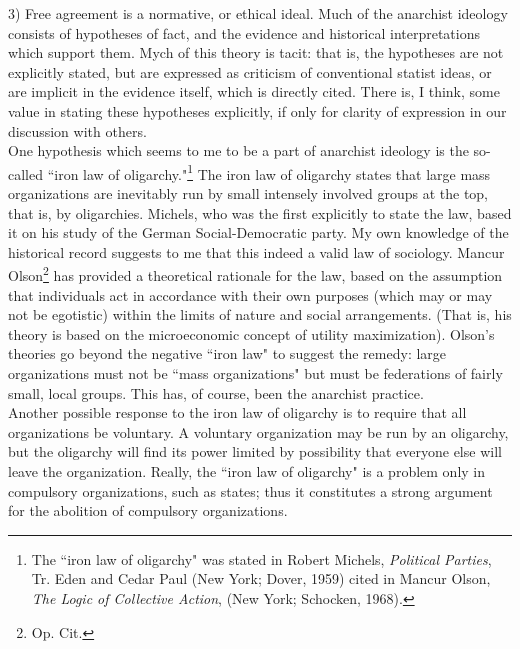 \documentclass[12pt, onecolumn, letterpaper, oneside]{book}
\begin{document}
3) Free agreement is a normative, or ethical ideal. Much of the anarchist ideology consists of hypotheses of fact, and the evidence and historical interpretations which support them. Mych of this theory is tacit: that is, the hypotheses are not explicitly stated, but are expressed as criticism of conventional statist ideas, or are implicit in the evidence itself, which is directly cited. There is, I think, some value in stating these hypotheses explicitly, if only for clarity of expression in our discussion with others.\\
One hypothesis which seems to me to be a part of anarchist ideology is the so-called ``iron law of oligarchy."\footnote{The ``iron law of oligarchy" was stated in Robert Michels, \emph{Political Parties}, Tr. Eden and Cedar Paul (New York; Dover, 1959) cited in Mancur Olson, \emph{The Logic of Collective Action}, (New York; Schocken, 1968).} The iron law of oligarchy states that large mass organizations are inevitably run by small intensely involved groups at the top, that is, by oligarchies. Michels, who was the first explicitly to state the law, based it on his study of the German Social-Democratic party. My own knowledge of the historical record suggests to me that this indeed a valid law of sociology. Mancur Olson\footnote{Op. Cit.} has provided a theoretical rationale for the law, based on the assumption that individuals act in accordance with their own purposes (which may or may not be egotistic) within the limits of nature and social arrangements. (That is, his theory is based on the microeconomic concept of utility maximization). Olson's theories go beyond the negative ``iron law" to suggest the remedy: large organizations must not be ``mass organizations" but must be federations of fairly small, local groups. This has, of course, been the anarchist practice.\\
Another possible response to the iron law of oligarchy is to require that all organizations be voluntary. A voluntary organization may be run by an oligarchy, but the oligarchy will find its power limited by possibility that everyone else will leave the organization. Really, the ``iron law of oligarchy" is a problem only in compulsory organizations, such as states; thus it constitutes a strong argument for the abolition of compulsory organizations.\\
\end{document}
